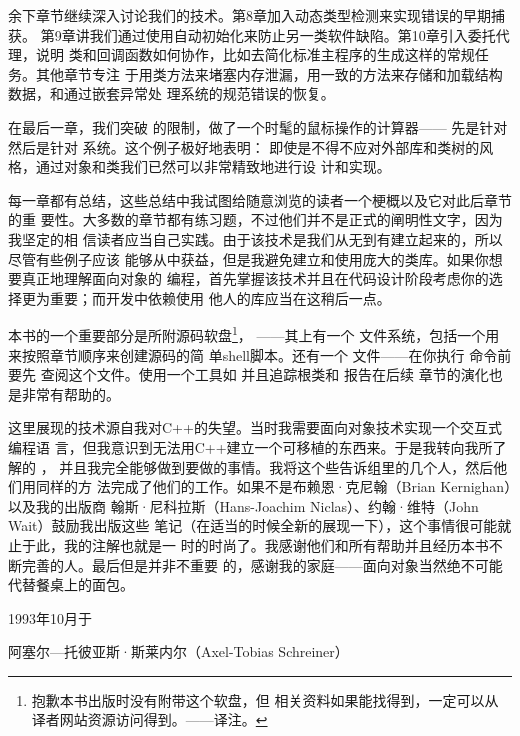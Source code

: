 余下章节继续深入讨论我们的技术。第8章加入动态类型检测来实现错误的早期捕获。
第9章讲我们通过使用自动初始化来防止另一类软件缺陷。第10章引入委托代理，说明
类和回调函数如何协作，比如去简化标准主程序的生成这样的常规任务。其他章节专注
于用类方法来堵塞内存泄漏，用一致的方法来存储和加载结构数据，和通过嵌套异常处
理系统的规范错误的恢复。

在最后一章，我们突破 的限制，做了一个时髦的鼠标操作的计算器——
先是针对 然后是针对 系统。这个例子极好地表明：
即使是不得不应对外部库和类树的风格，通过对象和类我们已然可以非常精致地进行设
计和实现。

每一章都有总结，这些总结中我试图给随意浏览的读者一个梗概以及它对此后章节的重
要性。大多数的章节都有练习题，不过他们并不是正式的阐明性文字，因为我坚定的相
信读者应当自己实践。由于该技术是我们从无到有建立起来的，所以尽管有些例子应该
能够从中获益，但是我避免建立和使用庞大的类库。如果你想要真正地理解面向对象的
编程，首先掌握该技术并且在代码设计阶段考虑你的选择更为重要；而开发中依赖使用
他人的库应当在这稍后一点。

本书的一个重要部分是所附源码软盘\footnote{抱歉本书出版时没有附带这个软盘，但
相关资料如果能找得到，一定可以从译者网站资源访问得到。\hfill ——译注。}，
——其上有一个 文件系统，包括一个用来按照章节顺序来创建源码的简
单shell脚本。还有一个 文件——在你执行 命令前要先
查阅这个文件。使用一个工具如 并且追踪根类和 报告在后续
章节的演化也是非常有帮助的。

这里展现的技术源自我对C++的失望。当时我需要面向对象技术实现一个交互式编程语
言，但我意识到无法用C++建立一个可移植的东西来。于是我转向我所了解的
，
并且我完全能够做到要做的事情。我将这个些告诉组里的几个人，然后他们用同样的方
法完成了他们的工作。如果不是布赖恩·克尼翰（Brian Kernighan）以及我的出版商
翰斯·尼科拉斯（Hans-Joachim Niclas）、约翰·维特（John Wait）鼓励我出版这些
笔记（在适当的时候全新的展现一下），这个事情很可能就止于此，我的注解也就是一
时的时尚了。我感谢他们和所有帮助并且经历本书不断完善的人。最后但是并非不重要
的，感谢我的家庭——面向对象当然绝不可能代替餐桌上的面包。 

\bigskip
\bigskip

\begin{flushright}
	1993年10月于

	阿塞尔—托彼亚斯·斯莱内尔（Axel-Tobias Schreiner）
\end{flushright}


